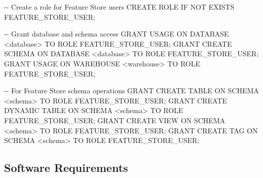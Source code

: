 \documentclass[
  letterpaper,
  DIV=11,
  numbers=noendperiod]{scrreprt}
\newenvironment{Shaded}{\begin{snugshade}}{\end{snugshade}}
\newcommand{\CommentTok}[1]{\textcolor[rgb]{0.37,0.37,0.37}{#1}}
\newcommand{\ControlFlowTok}[1]{\textcolor[rgb]{0.00,0.23,0.31}{#1}}
\newcommand{\KeywordTok}[1]{\textcolor[rgb]{0.00,0.23,0.31}{#1}}
\newcommand{\NormalTok}[1]{\textcolor[rgb]{0.00,0.23,0.31}{#1}}
\newcommand{\OperatorTok}[1]{\textcolor[rgb]{0.37,0.37,0.37}{#1}}
\begin{document}
\begin{Shaded}
\begin{Highlighting}[]
\CommentTok{{-}{-} Create a role for Feature Store users}
\KeywordTok{CREATE} \KeywordTok{ROLE} \ControlFlowTok{IF} \KeywordTok{NOT} \KeywordTok{EXISTS}\NormalTok{ FEATURE\_STORE\_USER;}

\CommentTok{{-}{-} Grant database and schema access}
\KeywordTok{GRANT} \KeywordTok{USAGE} \KeywordTok{ON} \KeywordTok{DATABASE} \OperatorTok{\textless{}}\KeywordTok{database}\OperatorTok{\textgreater{}} \KeywordTok{TO} \KeywordTok{ROLE}\NormalTok{ FEATURE\_STORE\_USER;}
\KeywordTok{GRANT} \KeywordTok{CREATE} \KeywordTok{SCHEMA} \KeywordTok{ON} \KeywordTok{DATABASE} \OperatorTok{\textless{}}\KeywordTok{database}\OperatorTok{\textgreater{}} \KeywordTok{TO} \KeywordTok{ROLE}\NormalTok{ FEATURE\_STORE\_USER;}
\KeywordTok{GRANT} \KeywordTok{USAGE} \KeywordTok{ON}\NormalTok{ WAREHOUSE }\OperatorTok{\textless{}}\NormalTok{warehouse}\OperatorTok{\textgreater{}} \KeywordTok{TO} \KeywordTok{ROLE}\NormalTok{ FEATURE\_STORE\_USER;}

\CommentTok{{-}{-} For Feature Store schema operations}
\KeywordTok{GRANT} \KeywordTok{CREATE} \KeywordTok{TABLE} \KeywordTok{ON} \KeywordTok{SCHEMA} \OperatorTok{\textless{}}\KeywordTok{schema}\OperatorTok{\textgreater{}} \KeywordTok{TO} \KeywordTok{ROLE}\NormalTok{ FEATURE\_STORE\_USER;}
\KeywordTok{GRANT} \KeywordTok{CREATE} \KeywordTok{DYNAMIC} \KeywordTok{TABLE} \KeywordTok{ON} \KeywordTok{SCHEMA} \OperatorTok{\textless{}}\KeywordTok{schema}\OperatorTok{\textgreater{}} \KeywordTok{TO} \KeywordTok{ROLE}\NormalTok{ FEATURE\_STORE\_USER;}
\KeywordTok{GRANT} \KeywordTok{CREATE} \KeywordTok{VIEW} \KeywordTok{ON} \KeywordTok{SCHEMA} \OperatorTok{\textless{}}\KeywordTok{schema}\OperatorTok{\textgreater{}} \KeywordTok{TO} \KeywordTok{ROLE}\NormalTok{ FEATURE\_STORE\_USER;}
\KeywordTok{GRANT} \KeywordTok{CREATE}\NormalTok{ TAG }\KeywordTok{ON} \KeywordTok{SCHEMA} \OperatorTok{\textless{}}\KeywordTok{schema}\OperatorTok{\textgreater{}} \KeywordTok{TO} \KeywordTok{ROLE}\NormalTok{ FEATURE\_STORE\_USER;}
\end{Highlighting}
\end{Shaded}

\hypertarget{software-requirements}{%
\subsection{Software Requirements}\label{software-requirements}}
\end{document}
